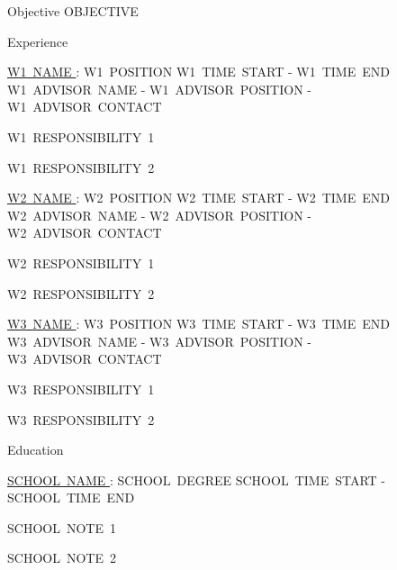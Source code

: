 \documentclass{resume} %
\begin{document}
  \begin{rSection}{Objective}
    OBJECTIVE
  \end{rSection}



  \begin{rSection}{Experience}

    \begin{rSubsection}{\underline{W1~NAME }: W1~POSITION }{ W1~TIME~START - W1~TIME~END }{ W1~ADVISOR~NAME - W1~ADVISOR~POSITION - W1~ADVISOR~CONTACT }

      \item W1~RESPONSIBILITY~1

      \item W1~RESPONSIBILITY~2

    \end{rSubsection}

    \begin{rSubsection}{\underline{W2~NAME }: W2~POSITION }{ W2~TIME~START - W2~TIME~END }{ W2~ADVISOR~NAME - W2~ADVISOR~POSITION - W2~ADVISOR~CONTACT }

      \item W2~RESPONSIBILITY~1

      \item W2~RESPONSIBILITY~2

    \end{rSubsection}

    \begin{rSubsection}{\underline{W3~NAME }: W3~POSITION }{ W3~TIME~START - W3~TIME~END }{ W3~ADVISOR~NAME - W3~ADVISOR~POSITION - W3~ADVISOR~CONTACT }

      \item W3~RESPONSIBILITY~1

      \item W3~RESPONSIBILITY~2

    \end{rSubsection}

  \end{rSection}

  \begin{rSection}{Education}

    \begin{rSubsection}{\underline{SCHOOL~NAME }: SCHOOL~DEGREE }{ SCHOOL~TIME~START - SCHOOL~TIME~END }{}

      \item SCHOOL~NOTE~1

      \item SCHOOL~NOTE~2

    \end{rSubsection}

  \end{rSection}
\end{document}

